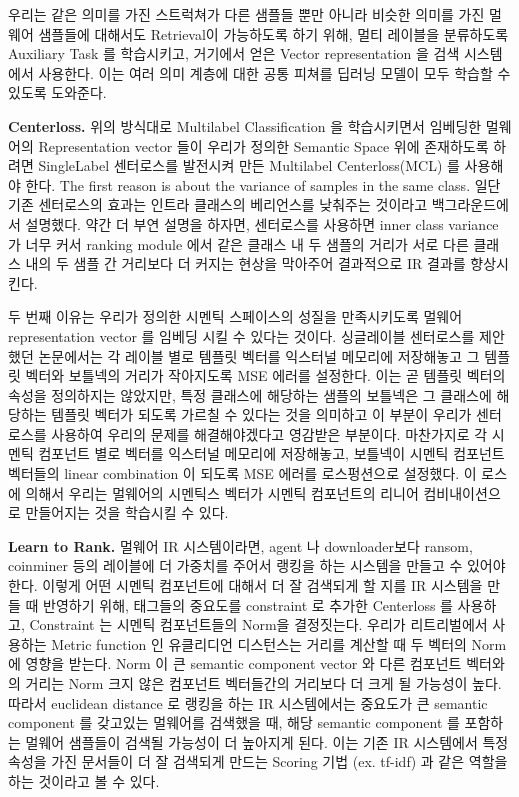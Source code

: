 우리는 같은 의미를 가진 스트럭쳐가 다른 샘플들 뿐만 아니라 비슷한 의미를 가진 멀웨어 샘플들에 대해서도 Retrieval이 가능하도록 하기 위해, 멀티 레이블을 분류하도록 Auxiliary Task 를 학습시키고, 거기에서 얻은 Vector representation 을 검색 시스템에서 사용한다. 이는 여러 의미 계층에 대한 공통 피쳐를 딥러닝 모델이 모두 학습할 수 있도록 도와준다. 


\textbf{Centerloss. }
위의 방식대로 Multilabel Classification 을 학습시키면서 임베딩한 멀웨어의 Representation vector 들이 우리가 정의한 Semantic Space 위에 존재하도록 하려면 SingleLabel 센터로스를 발전시켜 만든 Multilabel Centerloss(MCL) 를 사용해야 한다. 
The first reason is about the variance of samples in the same class. 일단 기존 센터로스의 효과는 인트라 클래스의 베리언스를 낮춰주는 것이라고 백그라운드에서 설명했다. 약간 더 부연 설명을 하자면, 센터로스를 사용하면 inner class variance 가 너무 커서 ranking module 에서 같은 클래스 내 두 샘플의 거리가 서로 다른 클래스 내의 두 샘플 간 거리보다 더 커지는 현상을 막아주어 결과적으로 IR 결과를 향상시킨다. 

두 번째 이유는 우리가 정의한 시멘틱 스페이스의 성질을 만족시키도록 멀웨어 representation vector 를 임베딩 시킬 수 있다는 것이다. 싱글레이블 센터로스를 제안했던 논문에서는 각 레이블 별로 템플릿 벡터를 익스터널 메모리에 저장해놓고 그 템플릿 벡터와 보틀넥의 거리가 작아지도록 MSE 에러를 설정한다. 이는 곧 템플릿 벡터의 속성을 정의하지는 않았지만, 특정 클래스에 해당하는 샘플의 보틀넥은 그 클래스에 해당하는 템플릿 벡터가 되도록 가르칠 수 있다는 것을 의미하고 이 부분이 우리가 센터로스를 사용하여 우리의 문제를 해결해야겠다고 영감받은 부분이다. 마찬가지로 각 시멘틱 컴포넌트 별로 벡터를 익스터널 메모리에 저장해놓고, 보틀넥이 시멘틱 컴포넌트 벡터들의 linear combination 이 되도록 MSE 에러를 로스펑션으로 설정했다. 이 로스에 의해서 우리는 멀웨어의 시멘틱스 벡터가 시멘틱 컴포넌트의 리니어 컴비내이션으로 만들어지는 것을 학습시킬 수 있다. 


\textbf{Learn to Rank. }
멀웨어 IR 시스템이라면, agent 나 downloader보다 ransom, coinminer 등의 레이블에 더 가중치를 주어서 랭킹을 하는 시스템을 만들고 수 있어야 한다. 이렇게 어떤 시멘틱 컴포넌트에 대해서 더 잘 검색되게 할 지를 IR 시스템을 만들 때 반영하기 위해, 태그들의 중요도를 constraint 로 추가한 Centerloss 를 사용하고, Constraint 는 시멘틱 컴포넌트들의 Norm을 결정짓는다. 우리가 리트리벌에서 사용하는 Metric function 인 유클리디언 디스턴스는 거리를 계산할 때 두 벡터의 Norm 에 영향을 받는다. Norm 이 큰 semantic component vector 와 다른 컴포넌트 벡터와의 거리는 Norm 크지 않은 컴포넌트 벡터들간의 거리보다 더 크게 될 가능성이 높다. 따라서 euclidean distance 로 랭킹을 하는 IR 시스템에서는 중요도가 큰 semantic component 를 갖고있는 멀웨어를 검색했을 때, 해당 semantic component 를 포함하는 멀웨어 샘플들이 검색될 가능성이 더 높아지게 된다. 이는 기존 IR 시스템에서 특정 속성을 가진 문서들이 더 잘 검색되게 만드는 Scoring 기법 (ex. tf-idf) 과 같은 역할을 하는 것이라고 볼 수 있다. 

